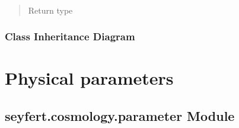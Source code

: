 \documentclass[letterpaper,10pt,english]{sphinxmanual}
\begin{document}
\begin{fulllineitems}
\begin{fulllineitems}
\begin{quote}
\begin{description}
\end{description}\end{quote}

\end{fulllineitems}


\begin{fulllineitems}
\label{\detokenize{api/seyfert.cosmology.cosmology.H5Cosmology:seyfert.cosmology.cosmology.H5Cosmology.writeToObject}}~\begin{quote}\begin{description}
\item[{Return type}] \leavevmode
\sphinxAtStartPar
{}

\end{description}\end{quote}

\end{fulllineitems}


\end{fulllineitems}



\subsubsection{Class Inheritance Diagram}
\label{\detokenize{cosmology:class-inheritance-diagram}}


\section{Physical parameters}
\label{\detokenize{parameter:physical-parameters}}\label{\detokenize{parameter::doc}}

\subsection{seyfert.cosmology.parameter Module}
\label{\detokenize{parameter:module-seyfert.cosmology.parameter}}\label{\detokenize{parameter:seyfert-cosmology-parameter-module}}
\end{document}
